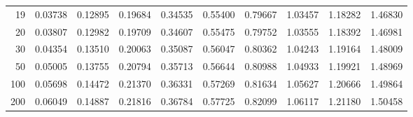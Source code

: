 \begin{figure}[h!]
\begin{center}
\begin{tabular}{|r|rrr|rrr|rrr|}
19&0.03738&0.12895&0.19684&0.34535&0.55400&0.79667&1.03457&1.18282&1.46830\\
20&0.03807&0.12982&0.19709&0.34607&0.55475&0.79752&1.03555&1.18392&1.46981\\
30&0.04354&0.13510&0.20063&0.35087&0.56047&0.80362&1.04243&1.19164&1.48009\\
50&0.05005&0.13755&0.20794&0.35713&0.56644&0.80988&1.04933&1.19921&1.48969\\
100&0.05698&0.14472&0.21370&0.36331&0.57269&0.81634&1.05627&1.20666&1.49864\\
200&0.06049&0.14887&0.21816&0.36784&0.57725&0.82099&1.06117&1.21180&1.50458\\
\hline
\end{tabular}
\end{center}
\end{figure}

\pagebreak
